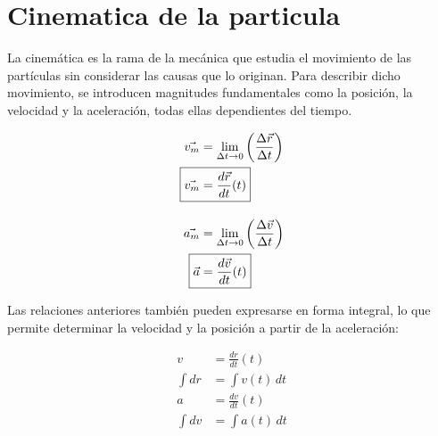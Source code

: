 \section{Cinematica de la particula}

La cinemática es la rama de la mecánica que estudia el movimiento de las partículas sin considerar las causas que lo originan. Para describir dicho movimiento, se introducen magnitudes fundamentales como la posición, la velocidad y la aceleración, todas ellas dependientes del tiempo.
\vspace{-20pt}

\begin{align*}
\vec{v_m} &= \lim_{\Delta t \to 0} \left(\frac{\Delta \vec{r}}{\Delta t}\right)\\
\Aboxed{\vec{v_m} &= \frac{d\vec{r}}{dt}(t)}\\[10pt]
\vec{a_m} &= \lim_{\Delta t \to 0} \left(\frac{\Delta \vec{v}}{\Delta t}\right)\\
\Aboxed{\vec{a} &= \frac{d\vec{v}}{dt}(t)}
\end{align*}

Las relaciones anteriores también pueden expresarse en forma integral, lo que permite determinar la velocidad y la posición a partir de la aceleración:

\vspace{-20pt}

\begin{align*}
v &= \frac{dr}{dt}(t) \\
\int dr &= \int v(t)\, dt \\
a &= \frac{dv}{dt}(t) \\
\int dv &= \int a(t)\, dt
\end{align*}

